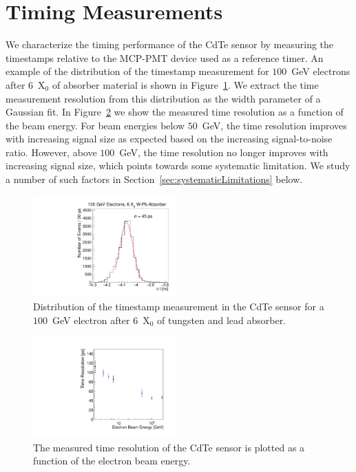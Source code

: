 
\section{Timing Measurements} 
\label{sec:timing} 

We characterize the timing performance of the CdTe sensor by measuring the timestamps
relative to the MCP-PMT device used as a reference timer. An example of the distribution 
of the timestamp measurement for $100$~GeV electrons after $6$~$\mathrm{X}_{0}$ of absorber
material is shown in Figure~\ref{fig:DeltaT}. We extract the time measurement
resolution from this distribution as the width parameter of a Gaussian fit.
In Figure~\ref{fig:TimeResolutionVsEnergy} we show the measured time resolution as a function of the
beam energy. For beam energies below $50$~GeV, the time resolution improves
with increasing signal size as expected based on the increasing signal-to-noise ratio.
However, above $100$~GeV, the time resolution no longer improves with 
increasing signal size, which points towards some systematic limitation. 
We study a number of such factors in Section~\ref{sec:systematicLimitations} below.

\begin{figure}[htbp] 
\centering
\includegraphics[width=0.49\textwidth]{figures/100GeV_deltaT.pdf} 
\caption{Distribution of the timestamp measurement in the CdTe sensor for a $100$~GeV
electron after $6$~$\mathrm{X}_{0}$ of tungsten and lead absorber. } 
\label{fig:DeltaT} 
\end{figure} 


\begin{figure}[htbp] 
\centering
\includegraphics[width=0.49\textwidth]{figures/TimeResolutionVsEnergy.pdf} 
\caption{ The measured time resolution of the CdTe sensor is plotted as a function
of the electron beam energy. } 
\label{fig:TimeResolutionVsEnergy} 
\end{figure} 


